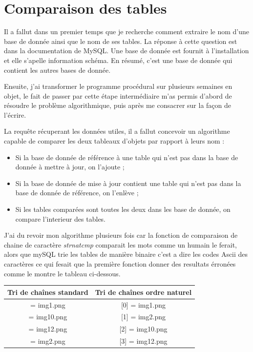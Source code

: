 \section{Comparaison des tables}


Il a fallut dans un premier temps que je recherche comment extraire le nom
d'une base de donnée ainsi que le nom de ses tables. La réponse à cette
question est dans la documentation de MySQL. Une base de donnée est fournit à
l'installation et elle s'apelle information schéma. En résumé, c'est une base
de donnée qui contient les autres bases de donnée.

Ensuite, j'ai transformer le programme procédural sur plusieurs semaines en
objet, le fait de passer par cette étape intermédiaire m'as permis d'abord de
résoudre le problème algorithmique, puis après me consacrer sur la façon de
l'écrire.

La requête récuperant les données utiles, il a fallut concevoir un algorithme
capable de comparer les deux tableaux d'objets par rapport à leurs nom :
\begin{itemize}
    \item Si la base de donnée de référence à une table qui n'est
        pas dans la base de donnée à mettre à jour, on l'ajoute ;
    \item Si la base de donnée de mise à jour contient une table qui n'est pas
        dans la base de donnée de référence, on l'enlève ;
    \item Si les tables comparées sont toutes les deux dans les base de donnée,
    on compare l'interieur des tables.
\end{itemize}

J'ai du revoir mon algorithme plusieurs fois car la fonction de comparaison de
chaine de caractère \emph{strnatcmp} comparait les mots comme un humain le
ferait, alors que mySQL trie les tables de manière binaire c'est a dire les
codes Ascii des caractères ce qui fesait que la première fonction donner des
resultats érronées comme le montre le tableau ci-dessous.

\begin{center}
\begin{tabular}{|c|c|}
\hline
\textbf{Tri de chaînes standard} & \textbf{Tri de chaînes ordre naturel} \\
\hline
[0] = img1.png & [0] = img1.png \\
\hline
[1] = img10.png & [1] = img2.png \\
\hline
[2] = img12.png & [2] = img10.png \\
\hline
[3] = img2.png & [3] = img12.png \\
\hline
\end{tabular}
\end{center}

